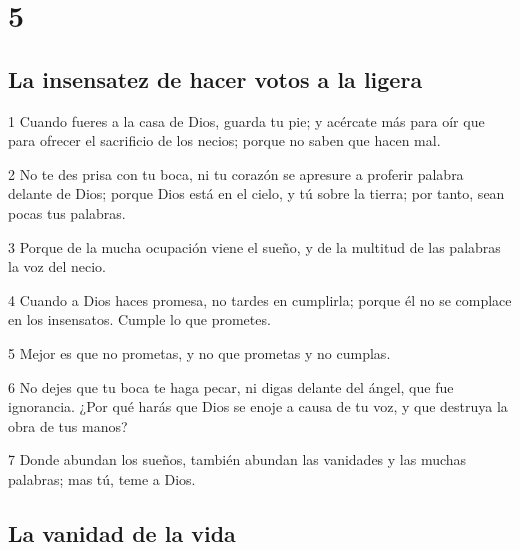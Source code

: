 \chapter{5}

\section*{La insensatez de hacer votos a la ligera}

\par 1 Cuando fueres a la casa de Dios, guarda tu pie; y acércate más para oír que para ofrecer el sacrificio de los necios; porque no saben que hacen mal.
\par 2 No te des prisa con tu boca, ni tu corazón se apresure a proferir palabra delante de Dios; porque Dios está en el cielo, y tú sobre la tierra; por tanto, sean pocas tus palabras.
\par 3 Porque de la mucha ocupación viene el sueño, y de la multitud de las palabras la voz del necio.
\par 4 Cuando a Dios haces promesa, no tardes en cumplirla; porque él no se complace en los insensatos. Cumple lo que prometes. 
\par 5 Mejor es que no prometas, y no que prometas y no cumplas.
\par 6 No dejes que tu boca te haga pecar, ni digas delante del ángel, que fue ignorancia. ¿Por qué harás que Dios se enoje a causa de tu voz, y que destruya la obra de tus manos?
\par 7 Donde abundan los sueños, también abundan las vanidades y las muchas palabras; mas tú, teme a Dios.

\section*{La vanidad de la vida}

